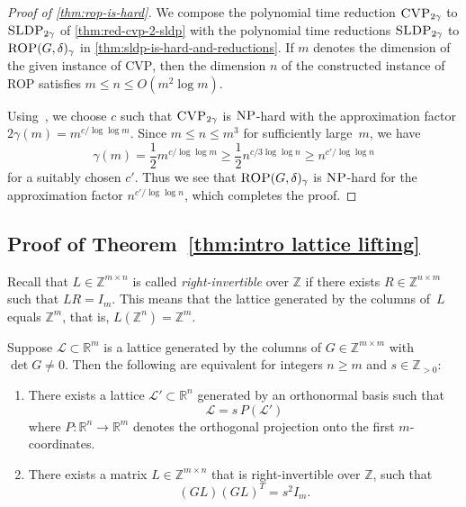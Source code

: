 \documentclass[a4paper,USenglish,cleveref,numberwithinsect]{lipics-v2021}
\newcommand{\ZZ}{\mathbb{Z}}
\newcommand{\RR}{\mathbb{R}}
\numberwithin{equation}{section}
\begin{document}
\begin{proof}[Proof of \cref{thm:rop-is-hard}]
We compose the polynomial time reduction
$\textsc{CVP}_{2\gamma}$ to $\textsc{SLDP}_{2\gamma}$
of \cref{thm:red-cvp-2-sldp}
with the  polynomial time  reductions
$\textsc{SLDP}_{2\gamma}$ to $\textsc{ROP}(G,\delta)_{\gamma}$
in \cref{thm:sldp-is-hard-and-reductions}.
If $m$ denotes the dimension of the given instance of \textsc{CVP},
then the dimension $n$ of the constructed instance of \textsc{ROP}
satisfies $m\le n \le O(m^2 \log m)$.


Using~\cite{dinurcvp}, we choose $c$ such that
$\textsc{CVP}_{2\gamma}$ is $\textsc{NP}$-hard
with the approximation factor
$2\gamma(m) = m^{c/\log\log m}$.
Since $m\le n \le m^3$ for sufficiently large~$m$,
we have
\[ \gamma(m)=\frac{1}{2}m^{c/\log\log m} \geq \frac{1}{2}n^{c/3\log\log n} \geq n^{c'/\log\log n}
\] for a suitably chosen $c'$.
Thus we see that $\textsc{ROP}(G,\delta)_{\gamma}$ is
$\textsc{NP}$-hard for the approximation factor
$n^{c'/\log\log n}$,
which completes the proof.
\end{proof}


\subsection{Proof of Theorem~\ref{thm:intro lattice lifting}}\label{sec:eutactic}
Recall that $L\in\ZZ^{m\times n}$ %
is called \textit{right-invertible} over $\ZZ$
if there exists $R\in\ZZ^{n\times m}$ such that $LR=I_m$.
This means that the lattice generated by the columns of~$L$ equals $\ZZ^m$, that is, $L(\ZZ^n) = \ZZ^m$.

\begin{proposition}\label{prop:eutactic}
Suppose $\mathcal{L}\subset\RR^m$ is a lattice generated by the columns of $G\in\ZZ^{m\times m}$ with $\det G\neq 0$.
Then the following are equivalent for integers $n\geq m$ and $s\in\ZZ_{>0}$:
\begin{enumerate}[(1)]
\item\label{it:eutactic 1} There exists a lattice $\mathcal{L}'\subset\RR^n$ generated by an orthonormal basis such that
\[
  \mathcal{L} = s\, P(\mathcal{L}')
\]
where $P:\RR^n\rightarrow\RR^m$ denotes the orthogonal projection onto the first $m$-coordinates.

\item\label{it:eutactic 2} There exists a matrix $L\in\ZZ^{m\times n}$ that is right-invertible over $\ZZ$, such that
\[
(GL)(GL)^T = s^2 I_m.
\]
\end{enumerate}
\end{proposition}
\end{document}
